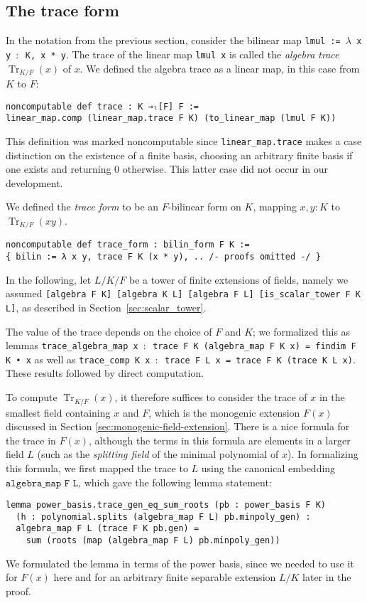 \documentclass[a4paper,USenglish,cleveref, autoref, thm-restate]{lipics-v2021}
\newcommand{\lean}[1]{\texttt{#1}\xspace}
\DeclareMathOperator{\Tr}{Tr}
\begin{document}
\subsection{The trace form}\label{sec:trace-form}
In the notation from the previous section, consider the bilinear map \lean{lmul := $\lambda$ x y $:$ K, x~*~y}.
The trace of the linear map \lean{lmul x} is called the \emph{algebra trace} $\Tr_{K / F}(x)$ of $x$.
We defined the algebra trace
as a linear map, in this case from $K$ to $F$:
\begin{lstlisting}
noncomputable def trace : K →ₗ[F] F :=
linear_map.comp (linear_map.trace F K) (to_linear_map (lmul F K))
\end{lstlisting}
This definition was marked noncomputable since \lean{linear\_map.trace} makes a case distinction on the existence of a finite basis,
choosing an arbitrary finite basis if one exists and returning $0$ otherwise.
This latter case did not occur in our development.

We defined the \emph{trace form} to be an $F$-bilinear form on $K$, mapping $x, y : K$ to $\Tr_{K/F}(xy)$.
\begin{lstlisting}
noncomputable def trace_form : bilin_form F K :=
{ bilin := λ x y, trace F K (x * y), .. /- proofs omitted -/ }
\end{lstlisting}

In the following, let $L / K / F$ be a tower of finite extensions of fields, namely we assumed \lean{[algebra F K] [algebra K L] [algebra F L] [is\_scalar\_tower F K L]}, as described in Section~\ref{sec:scalar_tower}.

The value of the trace depends on the choice of $F$ and $K$; we formalized this as lemmas \lean{trace\_algebra\_map x $:$ trace F K (algebra\_map F K x) = findim F K • x} as well as \lean{trace\_comp K x $:$ trace F L x = trace F K (trace K L x)}.
These results followed by direct computation.

To compute $\Tr_{K/F}(x)$, it therefore suffices to consider the trace of $x$ in the smallest field containing $x$ and $F$, which is the monogenic extension $F(x)$ discussed in Section \ref{sec:monogenic-field-extension}.
There is a nice formula for the trace in $F(x)$, although the terms in this formula are elements in a larger field $L$
(such as the \emph{splitting field} of the minimal polynomial of $x$).
In formalizing this formula, we first mapped the trace to $L$ using the canonical embedding $\lean{algebra\_map F L}$,
which gave the following lemma statement:
\begin{lstlisting}
lemma power_basis.trace_gen_eq_sum_roots (pb : power_basis F K)
  (h : polynomial.splits (algebra_map F L) pb.minpoly_gen) :
  algebra_map F L (trace F K pb.gen) =
    sum (roots (map (algebra_map F L) pb.minpoly_gen))
\end{lstlisting}
We formulated the lemma in terms of the power basis, since we needed to use it for $F(x)$ here
and for an arbitrary finite separable extension $L / K$ later in the proof.
\end{document}
